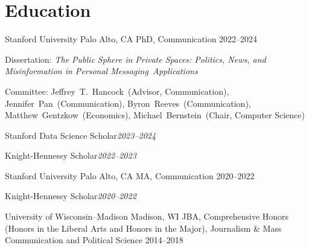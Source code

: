 \section{Education}

\cvedu
  {Stanford University}
  {Palo Alto, CA}
  {PhD, Communication}
  {}
  {2022--2024}
  {\item Dissertation: \textit{The Public Sphere in Private Spaces: Politics, News, and Misinformation in Personal Messaging~Applications}
   \item Committee: Jeffrey~T.~Hancock~(Advisor, Communication), Jennifer~Pan~(Communication), Byron~Reeves~(Communication), Matthew~Gentzkow~(Economics), Michael~Bernstein~(Chair, Computer Science)
   \item Stanford Data Science Scholar\hfill{\itshape\color{muted}2023--2024}
   \item Knight-Hennessy Scholar\hfill{\itshape\color{muted}2022--2023}}

\cvedu
  {Stanford University}
  {Palo Alto, CA}
  {MA, Communication}
  {}
  {2020--2022}
  {\item Knight-Hennessy Scholar\hfill{\itshape\color{muted}2020--2022}}

\cvedu
  {University of Wisconsin--Madison}
  {Madison, WI}
  {JBA, Comprehensive Honors (Honors in the Liberal Arts and Honors in the Major), Journalism \& Mass Communication and Political Science}
  {}
  {2014--2018}
  {}
